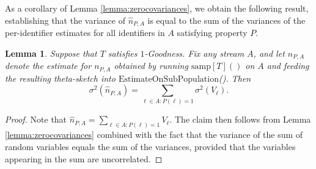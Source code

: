 \documentclass{article}
\newtheorem{lemma}[theorem]{Lemma}
\newcommand{\romTS}{\hat{n}}
\newcommand{\estonsub}{\mathrm{EstimateOnSubPopulation}}
\newcommand{\samp}{\mathrm{samp}}
\begin{document}
As a corollary of Lemma \ref{lemma:zerocovariances}, we obtain the following result, establishing that the variance 
of $\romTS_{P, A}$ is equal to the sum of the variances of the per-identifier estimates for all identifiers in $A$ satisfying property $P$.

\begin{lemma} \label{the_corollary} Suppose that $T$ satisfies $1$-Goodness. Fix any stream $A$, and let $\romTS_{P, A}$
denote the estimate for $n_{P, A}$ obtained by running $\samp[T]()$ on $A$ and feeding the resulting theta-sketch into $\estonsub$().
Then
$$\sigma^2(\romTS_{P,A}) = \sum_{\ell \in A \colon P(\ell) = 1} \sigma^2(V_\ell).$$
\end{lemma}
\begin{proof}
Note that $\romTS_{P,A} = \sum_{\ell \in A \colon P(\ell)=1} V_\ell$. The claim then follows from Lemma \ref{lemma:zerocovariances} combined with the fact
that the variance of the sum of random variables equals the sum of the variances, provided that the variables appearing in the sum are uncorrelated. 


\end{proof}
\end{document}

